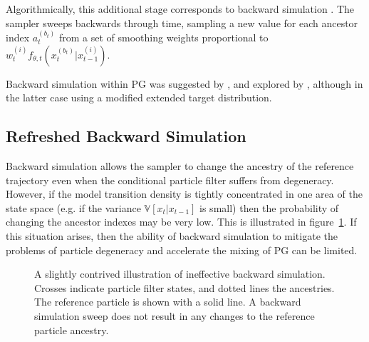 \documentclass[10pt]{article}
\newcommand{\ti}{t}
\newcommand{\ls}[1]{x_{#1}}
\newcommand{\an}[1]{a_{#1}}
\newcommand{\ai}[1]{b_{#1}}
\newcommand{\td}[1]{f_{\theta,#1}}
\newcommand{\pw}[1]{w_{#1}}
\newcommand{\pss}[1]{^{(#1)}}
\begin{document}
Algorithmically, this additional stage corresponds to backward simulation \citep{Godsill2004}. The sampler sweeps backwards through time, sampling a new value for each ancestor index $\an{\ti}\pss{{\ai{\ti}}}$ from a set of smoothing weights proportional to $\pw{\ti}\pss{i}\td{\ti}(\ls{\ti}\pss{\ai{\ti}}|\ls{\ti-1}\pss{i})$.

Backward simulation within PG was suggested by \citep{Whiteley2010b}, and explored by \citep{Lindsten2012}, although in the latter case using a modified extended target distribution.


\subsection{Refreshed Backward Simulation}
Backward simulation allows the sampler to change the ancestry of the reference trajectory even when the conditional particle filter suffers from degeneracy. However, if the model transition density is tightly concentrated in one area of the state space (e.g. if the variance $\mathbb{V}[\ls{\ti}|\ls{\ti-1}]$ is small) then the probability of changing the ancestor indexes may be very low. This is illustrated in figure~\ref{fig:bs-fail}. If this situation arises, then the ability of backward simulation to mitigate the problems of particle degeneracy and accelerate the mixing of PG can be limited.

\begin{figure}
 \centering
 
 \caption{A slightly contrived illustration of ineffective backward simulation. Crosses indicate particle filter states, and dotted lines the ancestries. The reference particle is shown with a solid line. A backward simulation sweep does not result in any changes to the reference particle ancestry.}
 \label{fig:bs-fail}
\end{figure}
\end{document}

